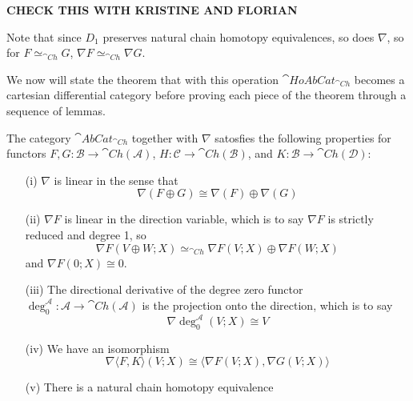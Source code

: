 \textbf{CHECK THIS WITH KRISTINE AND FLORIAN}


Note that since $D_1$ preserves natural chain homotopy equivalences, so does $\nabla$, so for $F\simeq_{\cat{Ch}}G$, $\nabla F\simeq_{\cat{Ch}}\nabla G$.

We now will state the theorem that with this operation $\cat{HoAbCat}_{\cat{Ch}}$ becomes a cartesian differential category before proving each piece of the theorem through a sequence of lemmas.


\begin{thm}[label=thm:6.5]
    The category $\cat{AbCat}_{\cat{Ch}}$ together with $\nabla$ satosfies the following properties for functors $F,G:\mathcal{B}\to \cat{Ch}(\mathcal{A})$, $H:\mathcal{C}\to \cat{Ch}(\mathcal{B})$, and $K:\mathcal{B}\to \cat{Ch}(\mathcal{D})$:
    \begin{itemize}
        \item[(i)] $\nabla$ is linear in the sense that 
            \begin{equation*}
                \nabla(F\oplus G)\cong \nabla(F)\oplus \nabla(G)
            \end{equation*}
        \item[(ii)] $\nabla F$ is linear in the direction variable, which is to say $\nabla F$ is strictly reduced and degree 1, so 
            \begin{equation*}
                \nabla F(V\oplus W;X)\simeq_{\cat{Ch}}\nabla F(V;X)\oplus \nabla F(W;X)
            \end{equation*}
        and $\nabla F(0;X)\cong 0$.
        \item[(iii)] The directional derivative of the degree zero functor $\deg_0^\mathcal{A}:\mathcal{A}\to \cat{Ch}(\mathcal{A})$ is the projection onto the direction, which is to say 
            \begin{equation*}
                \nabla \deg_0^\mathcal{A}(V;X)\cong V
            \end{equation*}
        \item[(iv)] We have an isomorphism
            \begin{equation*}
                \nabla \langle F,K\rangle (V;X)\cong \langle \nabla F(V;X),\nabla G(V;X)\rangle
            \end{equation*}
        \item[(v)] There is a natural chain homotopy equivalence 

\end{itemize}
\end{thm}
